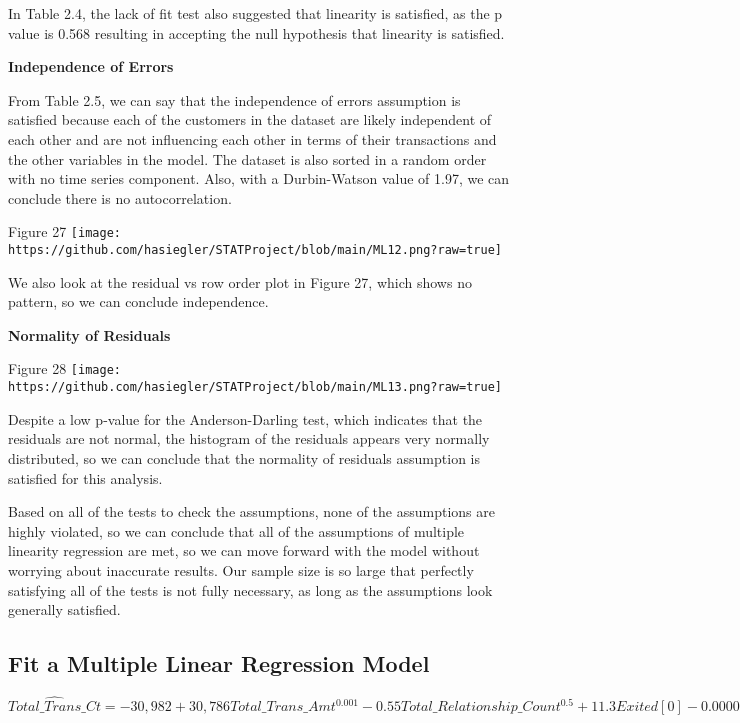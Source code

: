 \documentclass[
]{article}
\begin{document}
In Table 2.4, the lack of fit test also suggested that linearity is
satisfied, as the p value is 0.568 resulting in accepting the null
hypothesis that linearity is satisfied.

\textbf{Independence of Errors}

From Table 2.5, we can say that the independence of errors assumption is
satisfied because each of the customers in the dataset are likely
independent of each other and are not influencing each other in terms of
their transactions and the other variables in the model. The dataset is
also sorted in a random order with no time series component. Also, with
a Durbin-Watson value of 1.97, we can conclude there is no
autocorrelation.

Figure 27
\texttt{[image: https://github.com/hasiegler/STATProject/blob/main/ML12.png?raw=true]}

We also look at the residual vs row order plot in Figure 27, which shows
no pattern, so we can conclude independence.

\textbf{Normality of Residuals}

Figure 28
\texttt{[image: https://github.com/hasiegler/STATProject/blob/main/ML13.png?raw=true]}

Despite a low p-value for the Anderson-Darling test, which indicates
that the residuals are not normal, the histogram of the residuals
appears very normally distributed, so we can conclude that the normality
of residuals assumption is satisfied for this analysis.

Based on all of the tests to check the assumptions, none of the
assumptions are highly violated, so we can conclude that all of the
assumptions of multiple linearity regression are met, so we can move
forward with the model without worrying about inaccurate results. Our
sample size is so large that perfectly satisfying all of the tests is
not fully necessary, as long as the assumptions look generally
satisfied.

\hypertarget{fit-a-multiple-linear-regression-model}{%
\subsection{Fit a Multiple Linear Regression
Model}\label{fit-a-multiple-linear-regression-model}}

\(\widehat{Total\_Trans\_Ct} = -30,982 + 30,786Total\_Trans\_Amt^{0.001} - 0.55Total\_Relationship\_Count^{0.5} + 11.3Exited[0] - 0.00007Credit\_Limit\)
\end{document}
